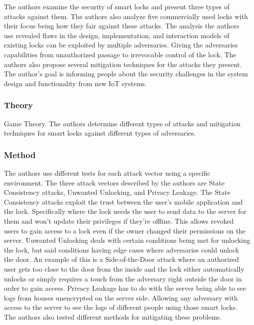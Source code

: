 \noindent
The authors examine the security of smart locks and present three types of attacks against them. The authors also analyze five commercially used locks with their focus being how they fair against these attacks. The analysis the authors use revealed flaws in the design, implementation, and interaction models of existing locks can be exploited by multiple adversaries. Giving the adversaries capabilities from unauthorized passage to irrevocable control of the lock. The authors also propose several mitigation techniques for the attacks they present. The author’s goal is informing people about the security challenges in the system design and functionality from new IoT systems.  

\subsubsection{Theory}

\noindent
Game Theory. The authors determine different types of attacks and mitigation techniques for smart locks against different types of adversaries.

\subsubsection{Method}

\noindent
The authors use different tests for each attack vector using a specific environment. The three attack vectors described by the authors are State Consistency attacks, Unwanted Unlocking, and Privacy Leakage. The State Consistency attacks exploit the trust between the user’s mobile application and the lock. Specifically where the lock needs the user to send data to the server for them and won’t update their privileges if they’re offline. This allows revoked users to gain access to a lock even if the owner changed their permissions on the server. Unwanted Unlocking deals with certain conditions being met for unlocking the lock, but said conditions having edge cases where adversaries could unlock the door. An example of this is a Side-of-the-Door attack where an authorized user gets too close to the door from the inside and the lock either automatically unlocks or simply requires a touch from the adversary right outside the door in order to gain access. Privacy Leakage has to do with the server being able to see logs from houses unencrypted on the server side. Allowing any adversary with access to the server to see the logs of different people using those smart locks. The authors also tested different methods for mitigating these problems.

